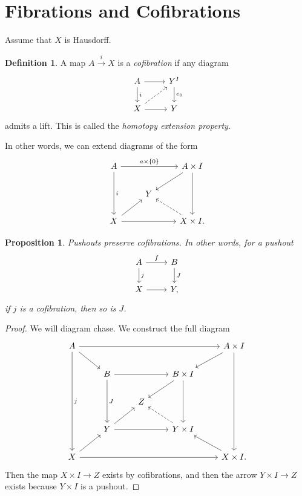 \documentclass[leqno, openany]{memoir}
\newtheorem{prop}[thm]{Proposition}
\theoremstyle{definition}
\newtheorem{defn}[thm]{Definition}
\theoremstyle{remark}
\theoremstyle{plain}
\theoremstyle{definition}
\theoremstyle{remark}
\begin{document}
\section{Fibrations and Cofibrations}%

Assume that $X$ is Hausdorff. 

\begin{defn} A map $ A \xrightarrow{i} X$ is a \textit{cofibration} if any
    diagram \begin{equation} \begin{tikzcd} A \arrow{r} \arrow{d}{i} & Y^I
    \arrow{d}{e_0} \\ X \arrow{r} \arrow[dashrightarrow]{ur} & Y \end{tikzcd}
    \end{equation} admits a lift. This is called the \textit{homotopy extension
    property}.  \end{defn}

In other words, we can extend diagrams of the form \begin{equation}
    \begin{tikzcd} A \arrow{rr}{a \times \{0\}} \arrow{dd}{i} & & A \times I
        \arrow{dd} \arrow{dl} \\ & Y & \\ X \arrow{rr} \arrow{ur} & & X \times
        I. \arrow[dashrightarrow]{ul} \end{tikzcd} \end{equation}

\begin{prop} Pushouts preserve cofibrations. In other words, for a pushout
    \begin{equation} \begin{tikzcd} A \arrow{r}{f} \arrow{d}{j} & B
    \arrow{d}{J} \\ X \arrow{r} & Y, \end{tikzcd} \end{equation} if $j$ is a
    cofibration, then so is $J$.  \end{prop}

\begin{proof} We will diagram chase. We construct the full diagram
    \begin{equation} \begin{tikzcd} A \arrow{rrrr} \arrow{dddd}{j} \arrow{dr} &
    & & & A \times I \arrow{dl} \arrow{dddd} \\ & B \arrow{rr} \arrow{dd}{J} &
    & B \times I \arrow{dl} \arrow{dd} \\ & & Z \\ & Y \arrow{rr} \arrow{ur} &
    & Y \times I \arrow[dashrightarrow]{ul} \\ X \arrow{ur} \arrow{rrrr} & & &
    & X \times I. \arrow{ul} \end{tikzcd} \end{equation} Then the map $X \times
    I \to Z$ exists by cofibrations, and then the arrow $Y \times I \to Z$
    exists because $Y \times I$ is a pushout.  \end{proof}
\end{document}
